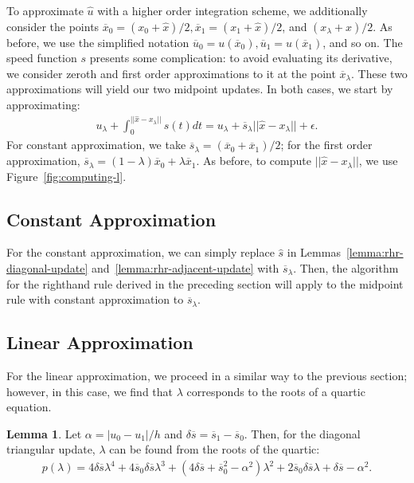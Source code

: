 \documentclass{article}
\theoremstyle{definition}
\newtheorem{lemma}{Lemma}
\begin{document}
To approximate $\hat{u}$ with a higher order integration scheme, we
additionally consider the points
$\overline{x}_0 = (x_0 + \hat{x})/2, \overline{x}_1 = (x_1 +
\hat{x})/2$, and $(x_\lambda + \hat{x})/2$. As before, we use the
simplified notation
$\overline{u}_0 = u(\overline{x}_0), \overline{u}_1 =
u(\overline{x}_1)$, and so on. The speed function $s$ presents some
complication: to avoid evaluating its derivative, we consider zeroth
and first order approximations to it at the point
$\overline{x}_\lambda$. These two approximations will yield our two
midpoint updates. In both cases, we start by approximating:
\begin{align*}
  u_{\lambda} + \int_0^{||\hat{x} - x_\lambda||} s(t) dt = u_\lambda + \overline{s}_\lambda ||\hat{x} - x_\lambda|| + \epsilon.
\end{align*}
For constant approximation, we take
$\overline{s}_\lambda = (\overline{x}_0 + \overline{x}_1)/2$; for the
first order approximation,
$\overline{s}_\lambda = (1 - \lambda) \overline{x}_0 + \lambda
\overline{x}_1$. As before, to compute $||\hat{x} - x_\lambda||$, we
use Figure~\ref{fig:computing-l}.

\subsection{Constant Approximation}

For the constant approximation, we can simply replace $\hat{s}$ in
Lemmas~\ref{lemma:rhr-diagonal-update}
and~\ref{lemma:rhr-adjacent-update} with $\overline{s}_\lambda$. Then,
the algorithm for the righthand rule derived in the preceding section
will apply to the midpoint rule with constant approximation to
$\overline{s}_\lambda$.

\subsection{Linear Approximation}

For the linear approximation, we proceed in a similar way to the
previous section; however, in this case, we find that $\lambda$
corresponds to the roots of a quartic equation.

\begin{lemma}\label{lemma:midpoint-diagonal-update}
  Let $\alpha = |u_0 - u_1|/h$ and
  $\delta \overline{s} = \overline{s}_1 - \overline{s}_0$. Then, for
  the diagonal triangular update, $\lambda$ can be found from the
  roots of the quartic:
  \begin{align*}
    p(\lambda) = 4 \delta \overline{s} \lambda^4 + 4 \overline{s}_0 \delta \overline{s} \lambda^3 + {(4 \delta \overline{s} + \overline{s}_0^2 - \alpha^2)} \lambda^2 + 2 \overline{s}_0 \delta \overline{s} \lambda + \delta \overline{s} - \alpha^2.
  \end{align*}
\end{lemma}
\end{document}
